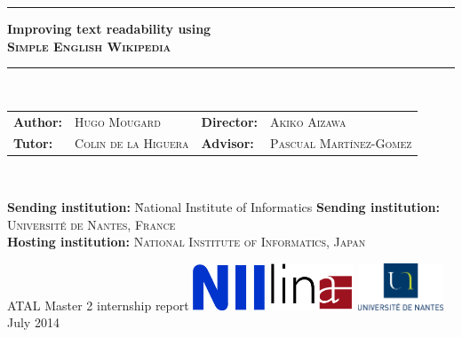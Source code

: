 \documentclass[a4paper, 11pt, onepage]{scrreprt}
\newcommand\sew{\textsc{Simple English Wikipedia}}
\begin{document}
\begin{titlepage}
  \begin{center}
    \noindent\rule{\textwidth}{0.4pt}
    {\huge\bfseries Improving text readability using\\
      \sew\\}
    \noindent\rule{\textwidth}{0.4pt}\\
    \vspace{1.5cm}
    {\large
    \begin{tabularx}{\textwidth}{lXll}
      \textbf{Author:} & \textsc{Hugo Mougard} &
      \textbf{Director:} & \textsc{Akiko Aizawa} \\
      \textbf{Tutor:} & \textsc{Colin de la Higuera} &
      \textbf{Advisor:} & \textsc{Pascual Martínez-Gomez} \\
    \end{tabularx}}\\[5pt]
    \vfill
    \parbox{0pt}{\large \begin{tabbing}
        \textbf{Sending institution:} \= National Institute of Informatics \kill
        \textbf{Sending institution:} \> \textsc{Université de Nantes, France} \\
        \textbf{Hosting institution:} \> \textsc{National Institute of
        Informatics, Japan} \\
      \end{tabbing}}
    \vfill
    {\LARGE ATAL Master 2 internship report}
    \vfill
    \includegraphics[width=0.16\textwidth]{img/nii.png}
    \hspace{0.03\textwidth}\hfill
    \includegraphics[width=0.19\textwidth]{img/lina.png}
    \hfill
    \includegraphics[width=0.19\textwidth]{img/univ.eps}
    \vfill
    {July 2014}
  \end{center}
\end{titlepage}
\end{document}
